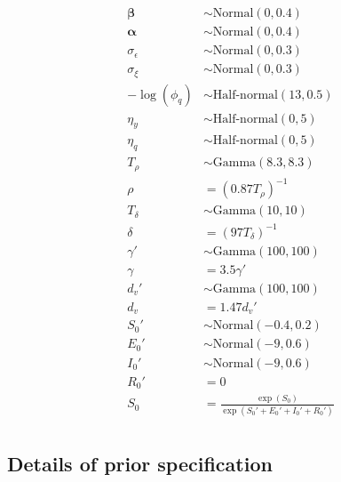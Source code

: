 \documentclass[10pt,letterpaper]{article}
\begin{document}
\begin{align}
\mathbf{\beta} & \sim \text{Normal}(0, 0.4)\\
\mathbf{\alpha} & \sim \text{Normal}(0, 0.4)\\
\sigma_{\epsilon} & \sim \text{Normal}(0, 0.3)\\
\sigma_{\xi} & \sim \text{Normal}(0, 0.3)\\
-\log(\phi_q) & \sim \text{Half-normal}(13, 0.5)\\
\eta_y &\sim \text{Half-normal}(0, 5)\\
\eta_q & \sim \text{Half-normal}(0, 5)\\
T_{\rho} & \sim \text{Gamma}(8.3, 8.3)\\
\rho & = (0.87 T_{\rho})^{-1}\\
T_{\delta} & \sim \text{Gamma}(10, 10)\\
\delta & = (97 T_{\delta})^{-1}\\
\gamma' & \sim \text{Gamma}(100, 100)\\
\gamma & = 3.5\gamma'\\
d_{v}' & \sim \text{Gamma}(100, 100)\\
d_v & = 1.47 d_v'\\
S_0' & \sim \text{Normal}(-0.4, 0.2)\\
E_0' & \sim \text{Normal}(-9, 0.6)\\
I_0' & \sim \text{Normal}(-9, 0.6)\\
R_0' & = 0\\
S_0 & = \frac{\exp(S_0)}{\exp(S_0' + E_0' + I_0' + R_0')} \\
\end{align}

\subsection*{Details of prior specification}
\end{document}
